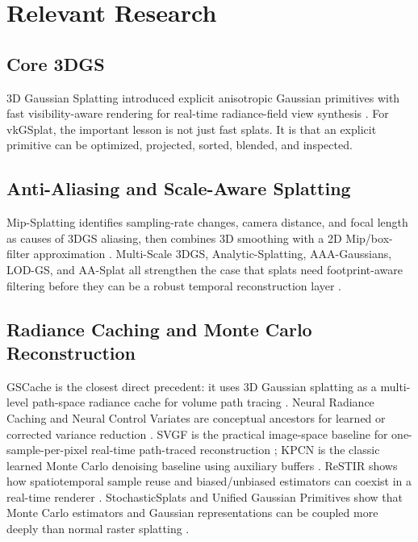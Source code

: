 \documentclass[11pt]{article}
\begin{document}
\section{Relevant Research}

\subsection{Core 3DGS}

3D Gaussian Splatting introduced explicit anisotropic Gaussian primitives with
fast visibility-aware rendering for real-time radiance-field view synthesis
\cite{kerbl2023gs}. For vkGSplat, the important lesson is not just fast splats.
It is that an explicit primitive can be optimized, projected, sorted, blended,
and inspected.

\subsection{Anti-Aliasing and Scale-Aware Splatting}

Mip-Splatting identifies sampling-rate changes, camera distance, and focal
length as causes of 3DGS aliasing, then combines 3D smoothing with a 2D
Mip/box-filter approximation \cite{yu2024mipsplat}. Multi-Scale 3DGS,
Analytic-Splatting, AAA-Gaussians, LOD-GS, and AA-Splat all strengthen the
case that splats need footprint-aware filtering before they can be a robust
temporal reconstruction layer
\cite{yan2024multiscale,liang2024analytic,steiner2025aaa,yang2025lodgs,suh2026aasplat}.

\subsection{Radiance Caching and Monte Carlo Reconstruction}

GSCache is the closest direct precedent: it uses 3D Gaussian splatting as a
multi-level path-space radiance cache for volume path tracing
\cite{bauer2026gscache}. Neural Radiance Caching and Neural Control Variates
are conceptual ancestors for learned or corrected variance reduction
\cite{muller2021nrc,muller2020ncv}. SVGF is the practical image-space baseline
for one-sample-per-pixel real-time path-traced reconstruction
\cite{schied2017svgf}; KPCN is the classic learned Monte Carlo denoising
baseline using auxiliary buffers \cite{bako2017kpcn}. ReSTIR shows how
spatiotemporal sample reuse and biased/unbiased estimators can coexist in a
real-time renderer \cite{bitterli2020restir}. StochasticSplats and Unified
Gaussian Primitives show that Monte Carlo estimators and Gaussian
representations can be coupled more deeply than normal raster splatting
\cite{kheradmand2025stochasticsplats,zhou2024unified}.
\end{document}
